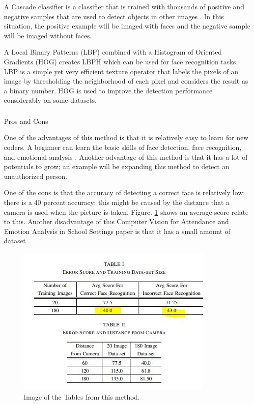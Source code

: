 \documentclass[conference]{IEEEtran}
\begin{document}
A Cascade classifier is a classifier that is trained with thousands of positive and negative samples that are used to detect objects in other images \cite{b2}. In this situation, the positive example will be imaged with faces and the negative sample will be imaged without faces.

A Local Binary Patterns (LBP) combined with a Histogram of Oriented Gradients (HOG) creates LBPH which can be used for face recognition tasks. LBP is a simple yet very efficient texture operator that labels the pixels of an image by thresholding the neighborhood of each pixel and considers the result as a binary number. HOG is used to improve the detection performance considerably on some datasets.

\subsubsection{}Pros and Cons 

One of the advantages of this method is that it is relatively easy to learn for new coders. A beginner can learn the basic skills of face detection, face recognition, and emotional analysis \cite{b1}. Another advantage of this method is that it has a lot of potentials to grow; an example will be expanding this method to detect an unauthorized person.

One of the cons is that the accuracy of detecting a correct face is relatively low; there is a 40 percent accuracy; this might be caused by the distance that a camera is used when the picture is taken. Figure. \ref{Emotion2} shows an average score relate to this.  Another disadvantage of this Computer Vision for Attendance and Emotion Analysis in School Settings paper is that it has a small amount of dataset \cite{b1}. 

\begin{figure}[htbp]
\centerline{\includegraphics[width=\columnwidth]{Attendance_Emotion_2.JPG}}
\caption{Image of the Tables from this method.}
\label{Emotion2}
\end{figure}
\end{document}
